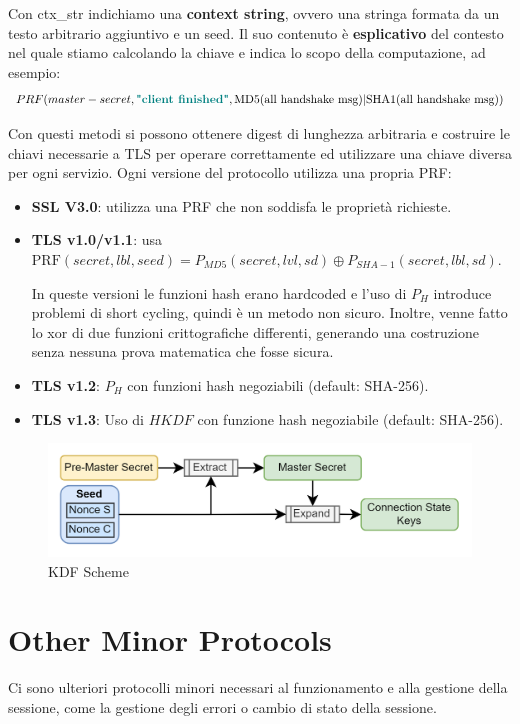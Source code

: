 \begin{remark}
Con ctx\_str indichiamo una \textbf{context string}, ovvero una stringa formata da un testo arbitrario aggiuntivo e un seed.
Il suo contenuto è \textbf{esplicativo} del contesto nel quale stiamo calcolando la chiave e indica lo scopo della computazione, ad esempio:
\[PRF(master-secret, \textcolor{teal}{\text{\textbf{"client finished"}}}, \text{MD5}(\text{all handshake msg})|\text{SHA1}(\text{all handshake msg}))\]
\end{remark}
Con questi metodi si possono ottenere digest di lunghezza arbitraria e costruire le chiavi necessarie a TLS per operare correttamente ed utilizzare una chiave diversa per ogni servizio. Ogni versione del protocollo utilizza una propria PRF:
\begin{itemize}
    \item \textbf{SSL V3.0}: utilizza una PRF che non soddisfa le proprietà richieste.
    \item \textbf{TLS v1.0/v1.1}: usa $\text{PRF}(secret, lbl,seed)=P_{MD5}(secret,lvl,sd)\oplus P_{SHA-1}(secret,lbl,sd)$.
    \begin{remark}
    In queste versioni le funzioni hash erano hardcoded e l'uso di $P_H$ introduce problemi di short cycling, quindi è un metodo non sicuro. Inoltre, venne fatto lo xor di due funzioni crittografiche differenti, generando una costruzione senza nessuna prova matematica che fosse sicura.
    \end{remark}
    \item \textbf{TLS v1.2}: $P_H$ con funzioni hash negoziabili (default: SHA-256).
    \item \textbf{TLS v1.3}: Uso di $HKDF$ con funzione hash negoziabile (default: SHA-256).
\end{itemize}
\begin{figure}[h]
    \centering
    \includegraphics{image/kdf.png}
    \caption{KDF Scheme}
    \label{fig:kdf}
\end{figure}

\section{Other Minor Protocols}
Ci sono ulteriori protocolli minori necessari al funzionamento e alla gestione della sessione, come la gestione degli errori o cambio di stato della sessione.
